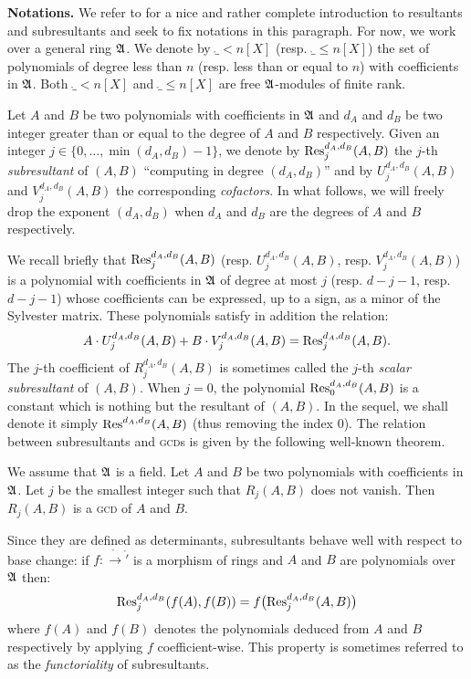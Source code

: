 \documentclass{sig-alternate}
\begin{document}
\medskip

\noindent
\textbf{Notations.} We refer to \cite{} for a nice and rather complete 
introduction to resultants and subresultants and seek to fix notations
in this paragraph. For now, we work over a 
general ring $\mathfrak A$. We denote by $\ring_{<n}[X]$ (resp. $\ring_{\leq 
n}[X]$) the set of polynomials of degree less than $n$ (resp. less than 
or equal to $n$) with coefficients in $\mathfrak A$. Both $\ring_{<n}[X]$ and 
$\ring_{\leq n}[X]$ are free $\mathfrak A$-modules of finite rank.

Let $A$ and $B$ be two polynomials with coefficients in $\mathfrak A$ and 
$d_A$ and $d_B$ be two integer greater than or equal to the degree of 
$A$ and $B$ respectively. Given an integer $j \in \{0, \ldots, \min 
(d_A, d_B)-1\}$, we denote by $\text{\rm Res}_j^{d_A, d_B}(A,B)$ the $j$-th 
\emph{subresultant} of $(A,B)$ ``computing in degree $(d_A, d_B)$'' and 
by $U_j^{d_A, d_B}(A,B)$ and $V_j^{d_A, d_B}(A,B)$ the corresponding 
\emph{cofactors}. In what follows, we will freely drop the exponent 
$(d_A,d_B)$ when $d_A$ and $d_B$ are the degrees of $A$ and $B$ 
respectively.

We recall briefly that $\text{\rm Res}_j^{d_A, d_B}(A,B)$ (resp. $U_j^{d_A, 
d_B}(A,B)$, resp. $V_j^{d_A, d_B}(A,B)$) is a polynomial with 
coefficients in $\mathfrak A$ of degree at most $j$ (resp. $d-j-1$, resp. 
$d-j-1$) whose coefficients can be expressed, up to a sign, as a minor 
of the Sylvester matrix. These polynomials satisfy in addition the
relation:
$$A \cdot U_j^{d_A,d_B}(A,B) + B \cdot V_j^{d_A,d_B}(A,B) = 
\text{\rm Res}^{d_A,d_B}_j(A,B).$$
The $j$-th coefficient of $R_j^{d_A,d_B}(A,B)$ is sometimes called the
$j$-th \emph{scalar subresultant} of $(A,B)$.
When $j=0$, the polynomial $\text{\rm Res}^{d_A,d_B}_0(A,B)$ is a constant which
is nothing but the resultant of $(A,B)$. In the sequel, we shall denote
it simply $\text{\rm Res}^{d_A,d_B}(A,B)$ (thus removing the index $0$).
The relation between subresultants and \textsc{gcd}s is given by the
following well-known theorem.

\begin{theo}
We assume that $\mathfrak A$ is a field. Let $A$ and $B$ be two polynomials
with coefficients in $\mathfrak A$. Let $j$ be the smallest integer such
that $R_j(A,B)$ does not vanish. Then $R_j(A,B)$ is a \textsc{gcd}
of $A$ and $B$.
\end{theo}

Since they are defined as determinants, subresultants behave well with 
respect to base change: if $f : \ring \to \ring'$ is a morphism of rings 
and $A$ and $B$ are polynomials over $\mathfrak A$ then:
$$\text{\rm Res}_j^{d_A,d_B}(f(A),f(B)) = f\big(\text{\rm Res}_j^{d_A,d_B}(A,B)\big)$$
where $f(A)$ and $f(B)$ denotes the polynomials deduced from $A$
and $B$ respectively by applying $f$ coefficient-wise. This property
is sometimes referred to as the \emph{functoriality} of subresultants.
\end{document}

